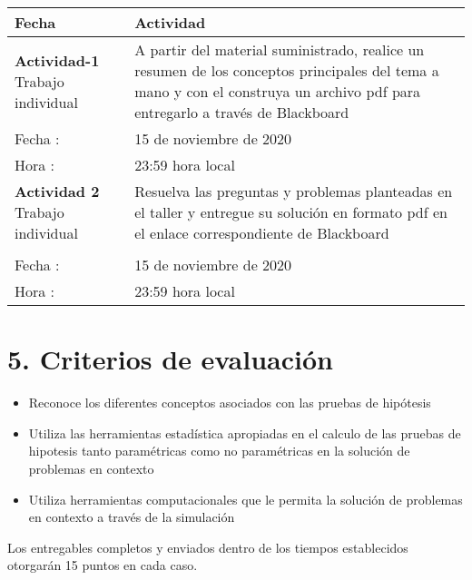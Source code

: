 \documentclass[base=hide,11pt]{elegantbook}
\begin{document}
\vspace{.5cm}
\begin{tabular}{p{4cm}p{10cm}}
	\hline	
	Fecha                   & Actividad \\
	\hline 	
	{\bf Actividad-1}  \hspace{4cm} Trabajo  individual      & A partir del material suministrado, realice un resumen de los conceptos principales del tema a mano y con el construya un archivo pdf para entregarlo a través de  Blackboard\\
	Fecha  : & 15 de noviembre de 2020\\
Hora   : & 23:59 hora local \\
\hline 
{\bf Actividad 2} \hspace{4cm} Trabajo  individual   & Resuelva las preguntas y problemas planteadas en  el  taller y entregue su solución  en formato  pdf en el enlace correspondiente de  Blackboard\\

&\\
Fecha  : & 15 de noviembre de 2020\\
Hora   : & 23:59 hora local \\
\hline 
\end{tabular}

\section*{5. Criterios de evaluación}

\begin{itemize}
	\item Reconoce los diferentes conceptos asociados con las pruebas de hipótesis 
	\item Utiliza las herramientas estadística apropiadas en el calculo de las pruebas de hipotesis tanto paramétricas como no paramétricas en la solución de problemas en contexto
	\item Utiliza herramientas computacionales que le permita  la solución de problemas en contexto a través de la simulación
\end{itemize}

Los entregables completos y enviados dentro de los tiempos establecidos  otorgarán 15 puntos en cada caso.
\end{document}
